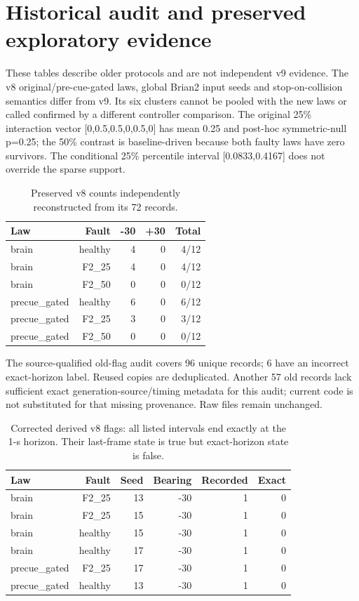 \documentclass[10pt,letterpaper]{article}
\begin{document}
\section{Historical audit and preserved exploratory evidence}

These tables describe older protocols and are not independent v9 evidence. The v8 original/pre-cue-gated laws, global Brian2 input seeds and stop-on-collision semantics differ from v9. Its six clusters cannot be pooled with the new laws or called confirmed by a different controller comparison. The original 25\% interaction vector [0,0.5,0.5,0,0.5,0] has mean 0.25 and post-hoc symmetric-null p=0.25; the 50\% contrast is baseline-driven because both faulty laws have zero survivors. The conditional 25\% percentile interval [0.0833,0.4167] does not override the sparse support.

\begin{table}[H]
\centering\small
\caption{Preserved v8 counts independently reconstructed from its 72 records.}
\begin{tabular}{lrrrr}
\toprule
Law & Fault & -30 & +30 & Total\\
\midrule
brain & healthy & 4 & 0 & 4/12\\
brain & F2\_25 & 4 & 0 & 4/12\\
brain & F2\_50 & 0 & 0 & 0/12\\
precue\_gated & healthy & 6 & 0 & 6/12\\
precue\_gated & F2\_25 & 3 & 0 & 3/12\\
precue\_gated & F2\_50 & 0 & 0 & 0/12\\
\bottomrule
\end{tabular}
\end{table}

The source-qualified old-flag audit covers 96 unique records; 6 have an incorrect exact-horizon label. Reused copies are deduplicated. Another 57 old records lack sufficient exact generation-source/timing metadata for this audit; current code is not substituted for that missing provenance. Raw files remain unchanged.

\begin{table}[H]
\centering\small
\caption{Corrected derived v8 flags: all listed intervals end exactly at the 1-s horizon. Their last-frame state is true but exact-horizon state is false.}
\begin{tabular}{lrrrrr}
\toprule
Law & Fault & Seed & Bearing & Recorded & Exact\\
\midrule
brain & F2\_25 & 13 & -30 & 1 & 0\\
brain & F2\_25 & 15 & -30 & 1 & 0\\
brain & healthy & 15 & -30 & 1 & 0\\
brain & healthy & 17 & -30 & 1 & 0\\
precue\_gated & F2\_25 & 17 & -30 & 1 & 0\\
precue\_gated & healthy & 13 & -30 & 1 & 0\\
\bottomrule
\end{tabular}
\end{table}
\end{document}
